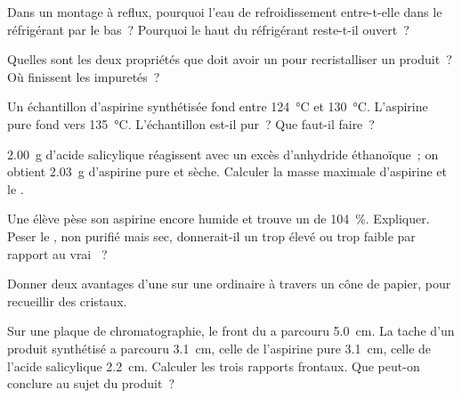 \begin{exercise}[$\star$]\label{exo:g10:synthesis-yield:3}
Dans un montage à reflux, pourquoi l'eau de refroidissement entre-t-elle
dans le réfrigérant par le bas~? Pourquoi le haut du réfrigérant
reste-t-il ouvert~?
\end{exercise}

\begin{exercise}[$\star$]\label{exo:g10:synthesis-yield:4}
Quelles sont les deux propriétés que doit avoir un  pour
recristalliser un produit~? Où finissent les impuretés~?
\end{exercise}

\begin{exercise}[$\star$]\label{exo:g10:synthesis-yield:5}
Un échantillon d'aspirine synthétisée fond entre \qty{124}{\celsius} et
\qty{130}{\celsius}. L'aspirine pure fond vers \qty{135}{\celsius}.
L'échantillon est-il pur~? Que faut-il faire~?
\end{exercise}

\begin{exercise}[$\star\star$]\label{exo:g10:synthesis-yield:6}
\qty{2.00}{g} d'acide salicylique réagissent avec un excès d'anhydride
éthanoïque~; on obtient \qty{2.03}{g} d'aspirine pure et sèche. Calculer
la masse maximale d'aspirine et le .
\end{exercise}

\begin{exercise}[$\star\star$]\label{exo:g10:synthesis-yield:7}
Une élève pèse son aspirine encore humide et trouve un  de
\qty{104}{\percent}. Expliquer. Peser le , non purifié mais
sec, donnerait-il un  trop élevé ou trop faible par rapport au
vrai ~?
\end{exercise}

\begin{exercise}[$\star\star$]\label{exo:g10:synthesis-yield:8}
Donner deux avantages d'une  sur une 
ordinaire à travers un cône de papier, pour recueillir des cristaux.
\end{exercise}

\begin{exercise}[$\star\star$]\label{exo:g10:synthesis-yield:9}
Sur une plaque de chromatographie, le front du  a parcouru
\qty{5.0}{cm}. La tache d'un produit synthétisé a parcouru
\qty{3.1}{cm}, celle de l'aspirine pure \qty{3.1}{cm}, celle de l'acide
salicylique \qty{2.2}{cm}. Calculer les trois rapports frontaux. Que
peut-on conclure au sujet du produit~?
\end{exercise}


